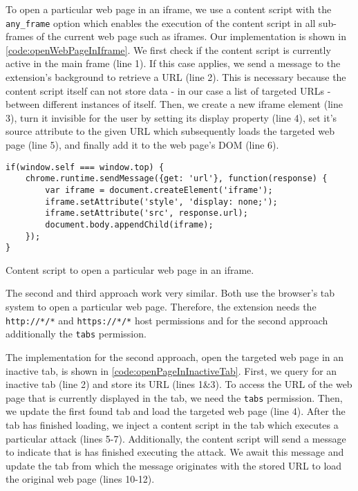 	To open a particular web page in an iframe, we use a content script with the \texttt{any\_frame} option which enables the execution of the content script in all sub-frames of the current web page such as iframes. Our implementation is shown in \autoref{code:openWebPageInIframe}. We first check if the content script is currently active in the main frame (line 1). If this case applies, we send a message to the extension's background to retrieve a URL (line 2). This is necessary because the content script itself can not store data - in our case a list of targeted URLs - between different instances of itself. Then, we create a new iframe element (line 3), turn it invisible for the user by setting its display property (line 4), set it's source attribute to the given URL which subsequently loads the targeted web page (line 5), and finally add it to the web page's DOM (line 6). 
	
	\begin{code}
		\begin{lstlisting}
if(window.self === window.top) {
	chrome.runtime.sendMessage({get: 'url'}, function(response) {
		var iframe = document.createElement('iframe');
		iframe.setAttribute('style', 'display: none;');
		iframe.setAttribute('src', response.url);
		document.body.appendChild(iframe);
	});
}
\end{lstlisting}
		\caption{Content script to open a particular web page in an iframe.}
		\label{code:openWebPageInIframe}
	\end{code}
	
	The second and third approach work very similar. Both use the browser's tab system to open a particular web page. Therefore, the extension needs the \texttt{http://*/*} and \texttt{https://*/*} host permissions and for the second approach additionally the \texttt{tabs} permission. 
	
	The implementation for the second approach, open the targeted web page in an inactive tab, is shown in \autoref{code:openPageInInactiveTab}. First, we query for an inactive tab (line 2) and store its URL (lines 1\&3). To access the URL of the web page that is currently displayed in the tab, we need the \texttt{tabs} permission. Then, we update the first found tab and load the targeted web page (line 4). After the tab has finished loading, we inject a content script in the tab which executes a particular attack (lines 5-7). Additionally, the content script will send a message to indicate that is has finished executing the attack. We await this message and update the tab from which the message originates with the stored URL to load the original web page (lines 10-12).
		

